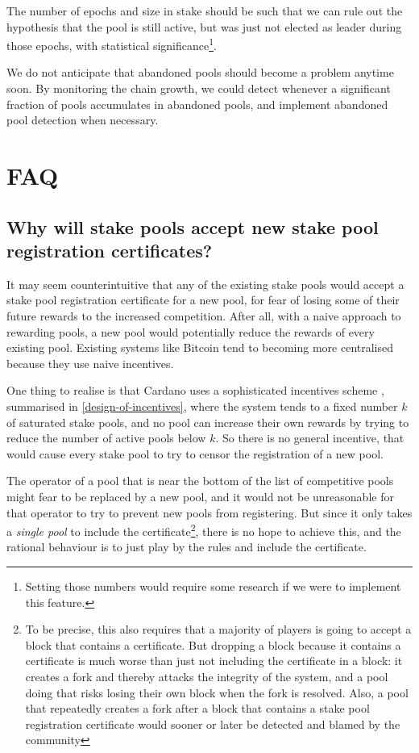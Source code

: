 \documentclass[11pt,a4paper,dvipsnames,twosided]{article}
\begin{document}
The number of epochs and size in stake should be such that we can rule out the
hypothesis that the pool is still active, but was just not elected as leader
during those epochs, with statistical significance\footnote{Setting those
  numbers would require some research if we were to implement this feature.}.

We do not anticipate that abandoned pools should become a problem anytime soon.
By monitoring the chain growth, we could detect whenever a significant fraction
of pools accumulates in abandoned pools, and implement abandoned pool detection
when necessary.

\section{FAQ}

\subsection{Why will stake pools accept new stake pool registration
  certificates?}

It may seem counterintuitive that any of the existing stake pools would accept a
stake pool registration certificate for a new pool, for fear of losing some of
their future rewards to the increased competition. After all, with a naive
approach to rewarding pools, a new pool would potentially reduce the rewards of
every existing pool. Existing systems like Bitcoin tend to becoming more
centralised because they use naive incentives.

One thing to realise is that Cardano uses a sophisticated incentives scheme
\citep{bkks2018}, summarised in \cref{design-of-incentives}, where the system
tends to a fixed number \(k\) of saturated stake pools, and no pool can increase
their own rewards by trying to reduce the number of active pools below \(k\). So
there is no general incentive, that would cause every stake pool to try to
censor the registration of a new pool.

The operator of a pool that is near the bottom of the list of competitive pools
might fear to be replaced by a new pool, and it would not be unreasonable for
that operator to try to prevent new pools from registering. But since it only
takes a \emph{single pool} to include the certificate\footnote{%
  To be precise, this also requires that a majority of players is going to
  accept a block that contains a certificate. But dropping a block because it
  contains a certificate is much worse than just not including the certificate
  in a block: it creates a fork and thereby attacks the integrity of the system,
  and a pool doing that risks losing their own block when the fork is resolved.
  Also, a pool that repeatedly creates a fork after a block that contains a
  stake pool registration certificate would sooner or later be detected and
  blamed by the community},%
there is no hope to achieve this, and the rational behaviour is to just play by
the rules and include the certificate.
\end{document}
